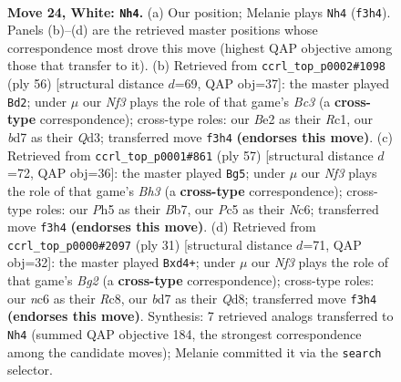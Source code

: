 \documentclass[11pt]{article}
\begin{document}
\clearpage

\begin{figure}[p]\centering
\begin{subfigure}{0.46\textwidth}\centering
\resizebox{\linewidth}{!}{%
\newchessgame
\chessboard[
  setfen={1rr3k1/1p1b1ppp/2n1p3/2Pp1q1P/p2P4/P1P2N2/R2QBPP1/2R2K2 w - - 5 24},
  showmover=false,
  pgfstyle=straightmove, color=movearrow, markmove={f3-h4}
]}
\caption{}
\end{subfigure}\hfill
\begin{subfigure}{0.46\textwidth}\centering
\resizebox{\linewidth}{!}{%
\newchessgame
\chessboard[
  setfen={r2r1bk1/1pq2pp1/2p1p2p/p2n4/P2P4/1PBQPN1P/5PP1/1RR3K1 w - - 17 29},
  showmover=false,
  pgfstyle=straightmove, color=movearrow, markmove={c3-d2}
]}
\caption{}
\end{subfigure}
\\[4pt]
\begin{subfigure}{0.46\textwidth}\centering
\resizebox{\linewidth}{!}{%
\newchessgame
\chessboard[
  setfen={3r2k1/1b2qp1p/2np2pb/4pP2/p1P1P3/1n1N3Q/1PN1B1PP/3R1R1K b - - 1 29},
  showmover=false,
  pgfstyle=straightmove, color=movearrow, markmove={h6-g5}
]}
\caption{}
\end{subfigure}\hfill
\begin{subfigure}{0.46\textwidth}\centering
\resizebox{\linewidth}{!}{%
\newchessgame
\chessboard[
  setfen={2rq1rk1/1p2ppbp/3p2p1/p4P1n/P2BP3/1PN5/1P1Q2PP/4RRK1 b - - 4 16},
  showmover=false,
  pgfstyle=straightmove, color=movearrow, markmove={g7-d4}
]}
\caption{}
\end{subfigure}
\caption{\textbf{Move 24, White: \texttt{Nh4}.} (a) Our position; Melanie plays \texttt{Nh4} (\texttt{f3h4}). Panels (b)--(d) are the retrieved master positions whose correspondence most drove this move (highest QAP objective among those that transfer to it). (b) Retrieved from \texttt{ccrl\_top\_p0002\#1098} (ply 56) [structural distance $d$=69, QAP obj=37]: the master played \texttt{Bd2}; under $\mu$ our \emph{Nf3} plays the role of that game's \emph{Bc3} (a \textbf{cross-type} correspondence); cross-type roles: our \emph{B}e2 as their \emph{R}c1, our \emph{b}d7 as their \emph{Q}d3; transferred move \texttt{f3h4} \textbf{(endorses this move)}. (c) Retrieved from \texttt{ccrl\_top\_p0001\#861} (ply 57) [structural distance $d$=72, QAP obj=36]: the master played \texttt{Bg5}; under $\mu$ our \emph{Nf3} plays the role of that game's \emph{Bh3} (a \textbf{cross-type} correspondence); cross-type roles: our \emph{P}h5 as their \emph{B}b7, our \emph{P}c5 as their \emph{N}c6; transferred move \texttt{f3h4} \textbf{(endorses this move)}. (d) Retrieved from \texttt{ccrl\_top\_p0000\#2097} (ply 31) [structural distance $d$=71, QAP obj=32]: the master played \texttt{Bxd4+}; under $\mu$ our \emph{Nf3} plays the role of that game's \emph{Bg2} (a \textbf{cross-type} correspondence); cross-type roles: our \emph{n}c6 as their \emph{R}c8, our \emph{b}d7 as their \emph{Q}d8; transferred move \texttt{f3h4} \textbf{(endorses this move)}. Synthesis: 7 retrieved analogs transferred to \texttt{Nh4} (summed QAP objective 184, the strongest correspondence among the candidate moves); Melanie committed it via the \texttt{search} selector.}
\label{fig:thought-m46}
\end{figure}
\end{document}
